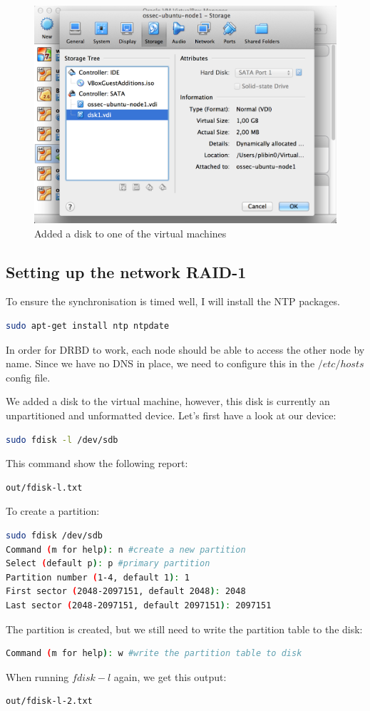 \documentclass[12pt]{report}
\begin{document}
\begin{figure}[h!]
  \caption{Added a disk to one of the virtual machines}
  \label{fig:add_disk_vbox}
  \centering
    \includegraphics[scale=0.3]{pics/add_disk_vbox.png}
\end{figure}

\subsection{Setting up the network RAID-1}
To ensure the synchronisation is timed well, I will install the NTP packages.
\begin{lstlisting}[language=bash]
sudo apt-get install ntp ntpdate
\end{lstlisting}

In order for DRBD to work, each node should be able to access the
other node by name. Since we have no DNS in place, we need to
configure this in the $/etc/hosts$ config file.

We added a disk to the virtual machine, however, this disk is
currently an unpartitioned and unformatted device.
Let's first have a look at our device:
\begin{lstlisting}[language=bash]
sudo fdisk -l /dev/sdb
\end{lstlisting}
This command show the following report:
\begin{lstlisting}[language=bash]
out/fdisk-l.txt
\end{lstlisting}
To create a partition:
\begin{lstlisting}[language=bash]
sudo fdisk /dev/sdb
Command (m for help): n #create a new partition
Select (default p): p #primary partition
Partition number (1-4, default 1): 1
First sector (2048-2097151, default 2048): 2048
Last sector (2048-2097151, default 2097151): 2097151
\end{lstlisting}
The partition is created, but we still need to write the partition
table to the disk:
\begin{lstlisting}[language=bash]
Command (m for help): w #write the partition table to disk
\end{lstlisting}
When running $fdisk -l$ again, we get this output:
\begin{lstlisting}[language=bash]
out/fdisk-l-2.txt
\end{lstlisting}
\end{document}
